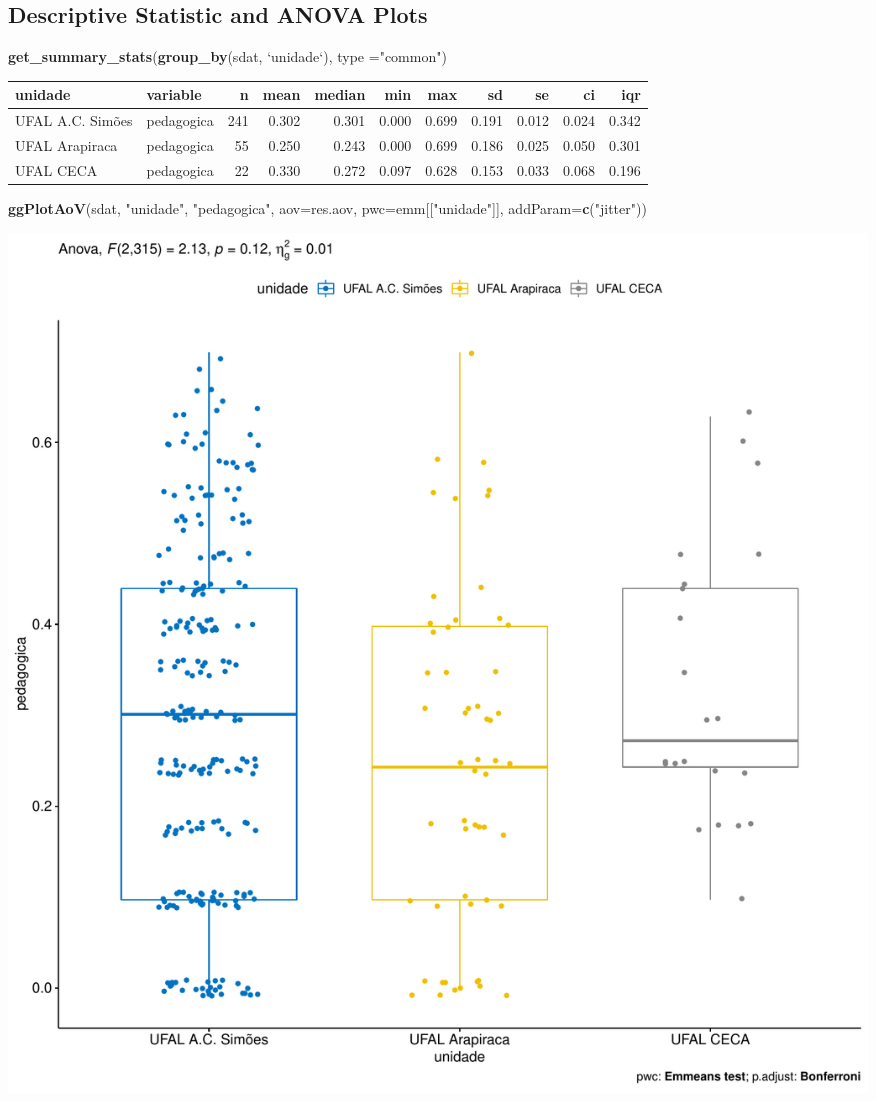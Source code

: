 \documentclass[]{article}
\newenvironment{Shaded}{\begin{snugshade}}{\end{snugshade}}
\newcommand{\DataTypeTok}[1]{\textcolor[rgb]{0.13,0.29,0.53}{#1}}
\newcommand{\KeywordTok}[1]{\textcolor[rgb]{0.13,0.29,0.53}{\textbf{#1}}}
\newcommand{\NormalTok}[1]{#1}
\newcommand{\StringTok}[1]{\textcolor[rgb]{0.31,0.60,0.02}{#1}}
\begin{document}
\hypertarget{descriptive-statistic-and-anova-plots}{%
\subsection{Descriptive Statistic and ANOVA
Plots}\label{descriptive-statistic-and-anova-plots}}

\begin{Shaded}
\begin{Highlighting}[]
\KeywordTok{get_summary_stats}\NormalTok{(}\KeywordTok{group_by}\NormalTok{(sdat, }\StringTok{`}\DataTypeTok{unidade}\StringTok{`}\NormalTok{), }\DataTypeTok{type =}\StringTok{"common"}\NormalTok{)}
\end{Highlighting}
\end{Shaded}

\begin{longtable}[]{@{}llrrrrrrrrr@{}}
\toprule
unidade & variable & n & mean & median & min & max & sd & se & ci &
iqr\tabularnewline
\midrule
\endhead
UFAL A.C. Simões & pedagogica & 241 & 0.302 & 0.301 & 0.000 & 0.699 &
0.191 & 0.012 & 0.024 & 0.342\tabularnewline
UFAL Arapiraca & pedagogica & 55 & 0.250 & 0.243 & 0.000 & 0.699 & 0.186
& 0.025 & 0.050 & 0.301\tabularnewline
UFAL CECA & pedagogica & 22 & 0.330 & 0.272 & 0.097 & 0.628 & 0.153 &
0.033 & 0.068 & 0.196\tabularnewline
\bottomrule
\end{longtable}

\begin{Shaded}
\begin{Highlighting}[]
\KeywordTok{ggPlotAoV}\NormalTok{(sdat, }\StringTok{"unidade"}\NormalTok{, }\StringTok{"pedagogica"}\NormalTok{, }\DataTypeTok{aov=}\NormalTok{res.aov, }\DataTypeTok{pwc=}\NormalTok{emm[[}\StringTok{"unidade"}\NormalTok{]], }\DataTypeTok{addParam=}\KeywordTok{c}\NormalTok{(}\StringTok{"jitter"}\NormalTok{))}
\end{Highlighting}
\end{Shaded}

\includegraphics{factorialAnova_files/figure-latex/unnamed-chunk-27-1.pdf}
\end{document}
